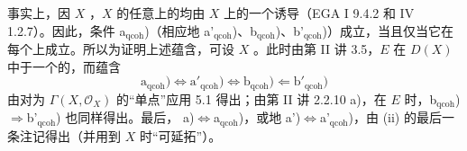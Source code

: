 事实上，因 $X$ ，$X$ 的任意上的均由 $X$ 上的一个诱导（EGA I 9.4.2 和 IV 1.2.7）。因此，条件 a$_{\mathrm{qcoh}}$)（相应地 a'$_{\mathrm{qcoh}}$)、b$_{\mathrm{qcoh}}$)、b'$_{\mathrm{qcoh}}$)）成立，当且仅当它在每个上成立。所以为证明上述蕴含，可设 $X$ 。此时由第 II 讲 3.5，$E$ 在 $D(X)$ 中于一个的，而蕴含
\[
\text{a}_{\mathrm{qcoh}}\text{)}\Longleftrightarrow
\text{a}'_{\mathrm{qcoh}}\text{)}\Longleftrightarrow
\text{b}_{\mathrm{qcoh}}\text{)}\Longleftarrow
\text{b}'_{\mathrm{qcoh}}\text{)}
\]
由对为 $\Gamma(X,\mathcal O_X)$ 的“单点”应用 5.1 得出；由第 II 讲 2.2.10 a)，在 $E$ 时，b$_{\mathrm{qcoh}}$)$\Rightarrow$b'$_{\mathrm{qcoh}}$) 也同样得出。最后， a)$\Longleftrightarrow$a$_{\mathrm{qcoh}}$)，或地 a')$\Longleftrightarrow$a'$_{\mathrm{qcoh}}$)，由 (ii) 的最后一条注记得出（并用到 $X$ 时“可延拓”）。

